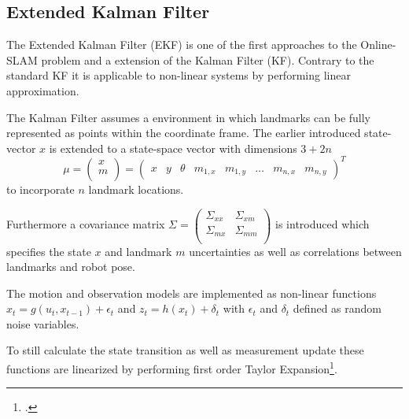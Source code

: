 \subsection{Extended Kalman Filter}
\label{sec:ExtendedKalmanFilter}
The Extended Kalman Filter (EKF) is one of the first approaches to the Online-SLAM problem and a extension of the Kalman Filter (KF). Contrary to the standard KF it is applicable to non-linear systems by performing linear approximation.


The Kalman Filter assumes a environment in which landmarks can be fully represented as points within the coordinate frame. The earlier introduced state-vector $ x $ is extended to a state-space vector with dimensions $ 3 + 2n$
\[ \mu = 
\begin{pmatrix}
	x \\
	m \\
\end{pmatrix}
=
\begin{pmatrix}
	x & y & \theta & m_{1, x} & m_{1, y} & \dots & m_{n, x} & m_{n, y} 
\end{pmatrix} ^{T}
\] 
to incorporate $n$ landmark locations. 

Furthermore a covariance matrix 
$ \Sigma = 
\begin{pmatrix}
	\Sigma_{xx} & \Sigma_{xm} \\
	\Sigma_{mx} & \Sigma_{mm} \\
\end{pmatrix} $ 
is introduced which specifies the state $ x $ and landmark $ m $ uncertainties as well as correlations between landmarks and robot pose. 

The motion and observation models are implemented as non-linear functions $x_{t} = g(u_{t}, x_{t - 1}) + \epsilon_{t}$ and $z_{t} = h(x_{t}) + \delta_{t}$ with $\epsilon_{t}$ and $\delta_{t}$ defined as random noise variables.%

To still calculate the state transition as well as measurement update these functions are linearized by performing first order Taylor Expansion\footcite[Pages 33-51]{thrun2002probabilisticRobotics}.

